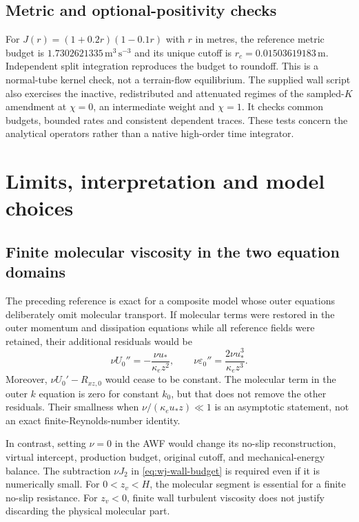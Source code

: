 \documentclass[11pt,a4paper]{article}
\numberwithin{equation}{section}
\newcommand{\eps}{\varepsilon}
\begin{document}
\subsection{Metric and optional-positivity checks}
For $J(r)=(1+0.2r)(1-0.1r)$ with $r$ in metres, the reference metric
budget is $1.7302621335\,\mathrm{m^3\,s^{-3}}$ and its unique cutoff
is $r_c=0.01503619183\,\mathrm m$. Independent split integration
reproduces the budget to roundoff. This is a normal-tube kernel check,
not a terrain-flow equilibrium.
The supplied wall script also exercises the inactive, redistributed
and attenuated regimes of the sampled-$K$ amendment at $\chi=0$, an
intermediate weight and $\chi=1$. It checks common budgets, bounded
rates and consistent dependent traces. These tests concern the
analytical operators rather than a native high-order time integrator.

\section{Limits, interpretation and model choices}
\label{sec:limits}
\subsection{Finite molecular viscosity in the two equation domains}
The preceding reference is exact for a composite model whose outer
equations deliberately omit molecular transport. If molecular terms
were restored in the outer momentum and dissipation equations while
all reference fields were retained, their additional residuals would be
\begin{equation}
 \nu U_0''=-\frac{\nu u_*}{\kappa_e z^2},\qquad
 \nu\eps_0''=\frac{2\nu u_*^3}{\kappa_e z^3}.
 \label{eq:finite-nu-outer-residuals}
\end{equation}
Moreover, $\nu U_0'-R_{xz,0}$ would cease to be constant. The molecular
term in the outer $k$ equation is zero for constant $k_0$, but that
does not remove the other residuals. Their smallness when
$\nu/(\kappa_e u_*z)\ll1$ is an asymptotic statement, not an exact
finite-Reynolds-number identity.

In contrast, setting $\nu=0$ in the AWF would change its no-slip
reconstruction, virtual intercept, production budget, original cutoff,
and mechanical-energy balance. The subtraction $\nu J_2$ in
\cref{eq:wj-wall-budget} is required even if it is numerically small.
For $0<z_v<H$, the molecular segment is essential for a finite
no-slip resistance. For $z_v<0$, finite wall turbulent viscosity does
not justify discarding the physical molecular part.
\end{document}
